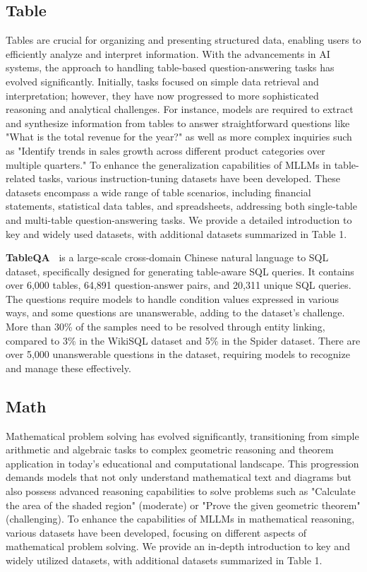 \subsection{Table}
Tables are crucial for organizing and presenting structured data, enabling users to efficiently analyze and interpret information. With the advancements in AI systems, the approach to handling table-based question-answering tasks has evolved significantly. Initially, tasks focused on simple data retrieval and interpretation; however, they have now progressed to more sophisticated reasoning and analytical challenges. For instance, models are required to extract and synthesize information from tables to answer straightforward questions like "What is the total revenue for the year?" as well as more complex inquiries such as "Identify trends in sales growth across different product categories over multiple quarters."
To enhance the generalization capabilities of MLLMs in table-related tasks, various instruction-tuning datasets have been developed. These datasets encompass a wide range of table scenarios, including financial statements, statistical data tables, and spreadsheets, addressing both single-table and multi-table question-answering tasks. We provide a detailed introduction to key and widely used datasets, with additional datasets summarized in Table 1.

\noindent \textbf{TableQA~\cite{sun2020tableqa}} is a large-scale cross-domain Chinese natural language to SQL dataset, specifically designed for generating table-aware SQL queries. It contains over 6,000 tables, 64,891 question-answer pairs, and 20,311 unique SQL queries. The questions require models to handle condition values expressed in various ways, and some questions are unanswerable, adding to the dataset's challenge. More than 30\% of the samples need to be resolved through entity linking, compared to 3\% in the WikiSQL dataset and 5\% in the Spider dataset. There are over 5,000 unanswerable questions in the dataset, requiring models to recognize and manage these effectively.



\subsection{Math}
Mathematical problem solving has evolved significantly, transitioning from simple arithmetic and algebraic tasks to complex geometric reasoning and theorem application in today's educational and computational landscape.  This progression demands models that not only understand mathematical text and diagrams but also possess advanced reasoning capabilities to solve problems such as "Calculate the area of the shaded region" (moderate) or "Prove the given geometric theorem" (challenging).  To enhance the capabilities of MLLMs in mathematical reasoning, various datasets have been developed, focusing on different aspects of mathematical problem solving. We provide an in-depth introduction to key and widely utilized datasets, with additional datasets summarized in Table 1.

